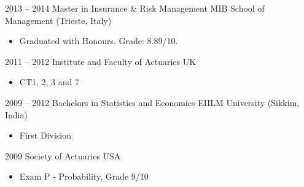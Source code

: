 \documentclass[a4paper,]{fortysecondscv}
\begin{document}
\begin{cvtable}[2]
    \cvitem
    {2013 -- 2014}
    {Master in Insurance \& Risk Management}
    {MIB School of Management (Trieste, Italy)}
    {
        \begin{itemize}[nosep, leftmargin=0pt, label={}] %
            \item Graduated with Honours. Grade: 8.89/10.
        \end{itemize}
    }
    \cvitem
    {2011 -- 2012}
    {Institute and Faculty of Actuaries}
    {UK}
    {
        \vspace{-\topsep}
        \begin{itemize}[nosep, leftmargin=0pt, label={}]
            \item CT1, 2, 3 and 7
        \end{itemize}
    }

    \cvitem
    {2009 -- 2012}
    {Bachelors in Statistics and Economics}
    {EIILM University (Sikkim, India)}
    {
        \vspace{-\topsep}
        \begin{itemize}[nosep, leftmargin=0pt, label={}]
            \item First Division
        \end{itemize}
    }
    \cvitem
    {2009}
    {Society of Actuaries}
    {USA}
    {
        \vspace{-\topsep}
        \begin{itemize}[nosep, leftmargin=0pt, label={}]
            \item Exam P - Probability, Grade 9/10
        \end{itemize}
    }
\end{cvtable}
\end{document}
